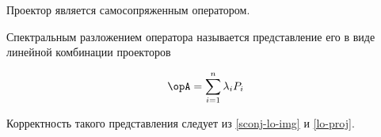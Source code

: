 \begin{remark}
  Проектор является самосопряженным оператором.
\end{remark}

\begin{definition}
  Спектральным разложением оператора называется представление его в виде
  линейной комбинации проекторов

  \begin{align*}
    \opA = \sum_{i = 1}^{n} \lambda_{i} P_{i}
  \end{align*}

  Корректность такого представления следует из \ref{sconj-lo-img} и
  \ref{lo-proj}.
\end{definition}